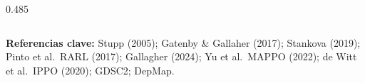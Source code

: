 \documentclass[final]{beamer}
\begin{document}
\begin{frame}[t]
\begin{columns}[t]
\begin{column}{0.485\textwidth}
\end{column}
\end{columns}

\vspace{4mm}
\begin{tcolorbox}[enhanced, colback=utan, colframe=uborder, boxrule=0.3mm, arc=1.5mm,
  left=6mm, right=6mm, top=2mm, bottom=2mm]
{\small\color{ink}
\textbf{\color{udark}Referencias clave:} Stupp (2005); Gatenby \& Gallaher (2017); Stankova (2019); Pinto et al.\ RARL (2017); Gallagher (2024); Yu et al.\ MAPPO (2022); de Witt et al.\ IPPO (2020); GDSC2; DepMap.}
\end{tcolorbox}

\end{frame}
\end{document}
